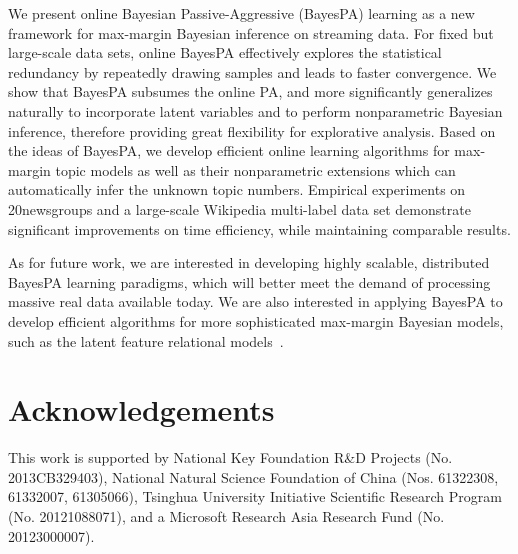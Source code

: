 \documentclass[twoside,11pt]{article}
\begin{document}
We present online Bayesian Passive-Aggressive (BayesPA) learning as a new framework for max-margin Bayesian inference on streaming data. For fixed but large-scale data sets, online BayesPA effectively explores the statistical redundancy by repeatedly drawing samples and leads to faster convergence. We show that BayesPA subsumes the online PA, and more significantly generalizes naturally to incorporate latent variables and to perform nonparametric Bayesian inference, therefore providing great flexibility for explorative analysis. 
Based on the ideas of BayesPA, we develop efficient online learning algorithms for max-margin topic models as well as their nonparametric extensions which can automatically infer the unknown topic numbers. Empirical experiments on 20newsgroups and a large-scale Wikipedia multi-label data set demonstrate significant improvements on time efficiency, while maintaining comparable results.

As for future work, we are interested in developing highly scalable, distributed \citep{broderick2013streaming} BayesPA learning paradigms, which will better meet the demand of processing massive real data available today. We are also interested in applying BayesPA to develop efficient algorithms for more sophisticated max-margin Bayesian models, such as the latent feature relational models~\citep{zhu2012maxlink}.


\section*{Acknowledgements}

This work is supported by National Key Foundation R\&D Projects (No. 2013CB329403), National Natural Science Foundation of China (Nos. 61322308, 61332007, 61305066), Tsinghua University Initiative Scientific Research Program (No. 20121088071), and a Microsoft Research Asia Research Fund (No. 20123000007).
\end{document}
